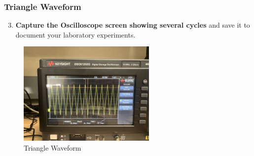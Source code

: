 \documentclass[12pt]{article}
\begin{document}
\subsubsection{Triangle Waveform}
\begin{enumerate}
\setcounter{enumi}{2}
\item \textbf{Capture the Oscilloscope screen showing several cycles} and save it to document your laboratory experiments.
\end{enumerate}
\begin{figure}[h]
    \centering
    \includegraphics[width=0.6\textwidth]{TriangleWaveform.jpeg}
    \caption{Triangle Waveform}
    \label{fig:Triangle-Waveform}
\end{figure}
\end{document}
